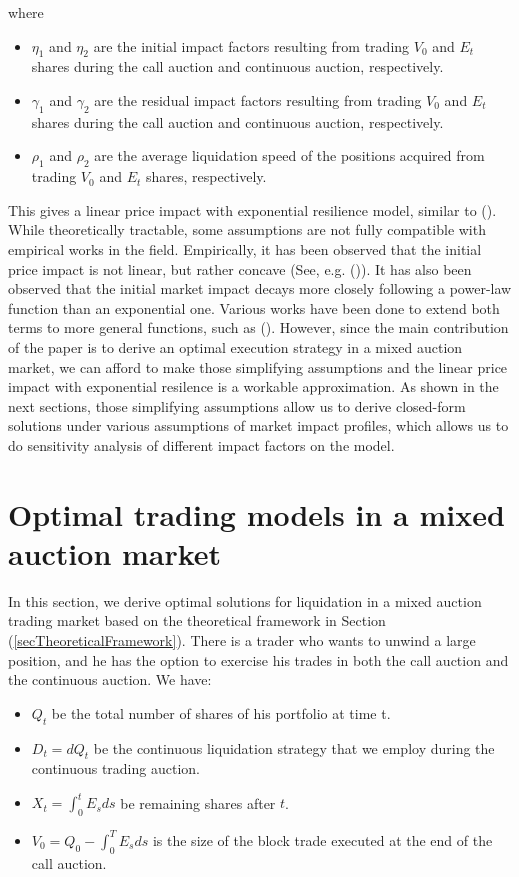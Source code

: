 \documentclass{article}
\begin{document}
where
\begin{itemize}
  \item $\eta_1$ and $\eta_2$ are the initial impact factors resulting from trading $V_0$ and $E_t$ shares during the call auction and continuous auction, respectively.
  \item $\gamma_1$ and $\gamma_2$ are the residual impact factors resulting from trading $V_0$ and $E_t$ shares during the call auction and continuous auction, respectively.
  \item $\rho_1$ and $\rho_2$ are the average liquidation speed of the positions acquired from trading $V_0$ and $E_t$ shares, respectively.
\end{itemize}

This gives a linear price impact with exponential resilience model, similar to (\cite{Obizhaeva2013}). While theoretically tractable, some assumptions are not fully compatible with empirical works in the field. Empirically, it has been observed that the initial price impact is not linear, but rather concave (See, e.g. (\cite{Eisler2009})). It has also been observed that the initial market impact decays more closely following a power-law function than an exponential one. Various works have been done to extend both terms to more general functions, such as (\cite{Alfonsi2010}). However, since the main contribution of the paper is to derive an optimal execution strategy in a mixed auction market, we can afford to make those simplifying assumptions and the linear price impact with exponential resilence is a workable approximation. As shown in the next sections, those simplifying assumptions allow us to derive closed-form solutions under various assumptions of market impact profiles, which allows us to do sensitivity analysis of different impact factors on the model.

\section{Optimal trading models in a mixed auction market}\label{secModel}

In this section, we derive optimal solutions for liquidation in a mixed auction trading market based on the theoretical framework in Section (\ref{secTheoreticalFramework}). There is a trader who wants to unwind a large position, and he has the option to exercise his trades in both the call auction and the continuous auction. We have:

\begin{itemize}
  \item $Q_t$ be the total number of shares of his portfolio at time t.
  \item $D_t=dQ_t$ be the continuous liquidation strategy that we employ during the continuous trading auction.
  \item $X_t=\int_0^t E_s ds$ be remaining shares after $t$.
  \item $V_0=Q_0 - \int_0^T E_s ds$ is the size of the block trade executed at the end of the call auction.
\end{itemize}
\end{document}

